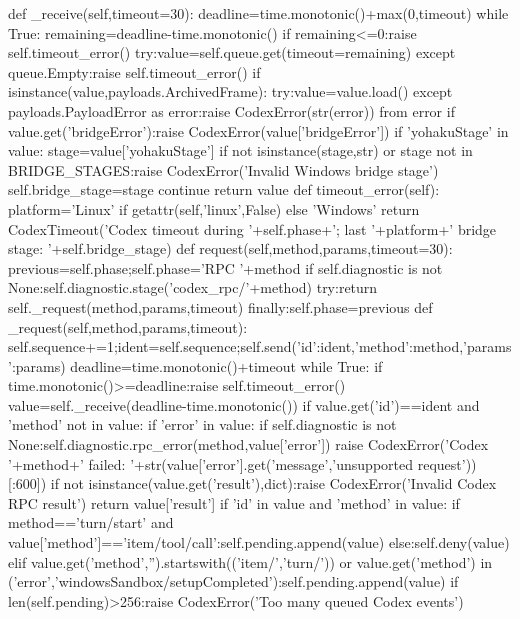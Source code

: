     def _receive(self,timeout=30):
        deadline=time.monotonic()+max(0,timeout)
        while True:
            remaining=deadline-time.monotonic()
            if remaining<=0:raise self.timeout_error()
            try:value=self.queue.get(timeout=remaining)
            except queue.Empty:raise self.timeout_error()
            if isinstance(value,payloads.ArchivedFrame):
                try:value=value.load()
                except payloads.PayloadError as error:raise CodexError(str(error)) from error
            if value.get('bridgeError'):raise CodexError(value['bridgeError'])
            if 'yohakuStage' in value:
                stage=value['yohakuStage']
                if not isinstance(stage,str) or stage not in BRIDGE_STAGES:raise CodexError('Invalid Windows bridge stage')
                self.bridge_stage=stage
                continue
            return value
    def timeout_error(self):
        platform='Linux' if getattr(self,'linux',False) else 'Windows'
        return CodexTimeout('Codex timeout during '+self.phase+'; last '+platform+' bridge stage: '+self.bridge_stage)
    def request(self,method,params,timeout=30):
        previous=self.phase;self.phase='RPC '+method
        if self.diagnostic is not None:self.diagnostic.stage('codex_rpc/'+method)
        try:return self._request(method,params,timeout)
        finally:self.phase=previous
    def _request(self,method,params,timeout):
        self.sequence+=1;ident=self.sequence;self.send({'id':ident,'method':method,'params':params})
        deadline=time.monotonic()+timeout
        while True:
            if time.monotonic()>=deadline:raise self.timeout_error()
            value=self._receive(deadline-time.monotonic())
            if value.get('id')==ident and 'method' not in value:
                if 'error' in value:
                    if self.diagnostic is not None:self.diagnostic.rpc_error(method,value['error'])
                    raise CodexError('Codex '+method+' failed: '+str(value['error'].get('message','unsupported request'))[:600])
                if not isinstance(value.get('result'),dict):raise CodexError('Invalid Codex RPC result')
                return value['result']
            if 'id' in value and 'method' in value:
                if method=='turn/start' and value['method']=='item/tool/call':self.pending.append(value)
                else:self.deny(value)
            elif value.get('method','').startswith(('item/','turn/')) or value.get('method') in ('error','windowsSandbox/setupCompleted'):self.pending.append(value)
            if len(self.pending)>256:raise CodexError('Too many queued Codex events')
